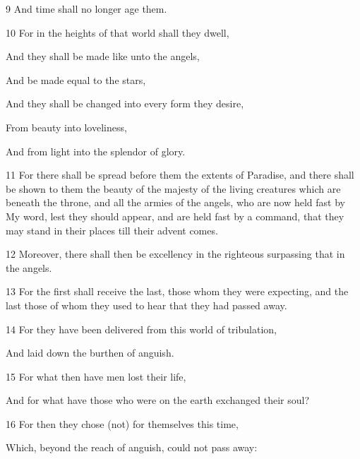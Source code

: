 \par 9 And time shall no longer age them.

\par 10 For in the heights of that world shall they dwell,

\par And they shall be made like unto the angels,

\par And be made equal to the stars,

\par And they shall be changed into every form they desire,

\par From beauty into loveliness,

\par And from light into the splendor of glory.

\par 11 For there shall be spread before them the extents of Paradise, and there shall be shown to them the beauty of the majesty of the living creatures which are beneath the throne, and all the armies of the angels, who are now held fast by My word, lest they should appear, and are held fast by a command, that they may stand in their places till their advent comes. 

\par 12 Moreover, there shall then be excellency in the righteous surpassing that in the angels. 

\par 13 For the first shall receive the last, those whom they were expecting, and the last those of whom they used to hear that they had passed away.

\par 14 For they have been delivered from this world of tribulation,

\par And laid down the burthen of anguish.

\par 15 For what then have men lost their life,

\par And for what have those who were on the earth exchanged their soul?

\par 16 For then they chose (not) for themselves this time,

\par Which, beyond the reach of anguish, could not pass away:

